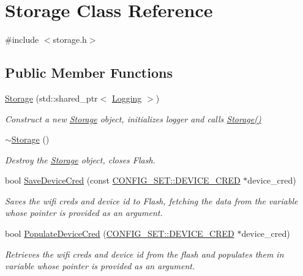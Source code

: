 \hypertarget{classStorage}{}\section{Storage Class Reference}
\label{classStorage}


{\ttfamily \#include $<$storage.\+h$>$}

\subsection*{Public Member Functions}
\begin{DoxyCompactItemize}
\item 
\hyperlink{classStorage_a6b40766d93f003a117435135e6c790bb}{Storage} (std\+::shared\+\_\+ptr$<$ \hyperlink{classLogging}{Logging} $>$)
\begin{DoxyCompactList}\small\item\em Construct a new \hyperlink{classStorage}{Storage} object, initializes logger and calls \hyperlink{classStorage_a6b40766d93f003a117435135e6c790bb}{Storage()} \end{DoxyCompactList}\item 
\hyperlink{classStorage_a73cf30f0a34250396f9eabee7dc5c93d}{$\sim$\+Storage} ()
\begin{DoxyCompactList}\small\item\em Destroy the \hyperlink{classStorage}{Storage} object, closes Flash. \end{DoxyCompactList}\item 
bool \hyperlink{classStorage_a6a1b8fc3b64a382e6b81228a40057677}{Save\+Device\+Cred} (const \hyperlink{structCONFIG__SET_1_1DEVICE__CRED}{C\+O\+N\+F\+I\+G\+\_\+\+S\+E\+T\+::\+D\+E\+V\+I\+C\+E\+\_\+\+C\+R\+ED} $\ast$device\+\_\+cred)
\begin{DoxyCompactList}\small\item\em Saves the wifi creds and device id to Flash, fetching the data from the variable whose pointer is provided as an argument. \end{DoxyCompactList}\item 
bool \hyperlink{classStorage_a6cd2e67130f5b1b753eea6e977ec4256}{Populate\+Device\+Cred} (\hyperlink{structCONFIG__SET_1_1DEVICE__CRED}{C\+O\+N\+F\+I\+G\+\_\+\+S\+E\+T\+::\+D\+E\+V\+I\+C\+E\+\_\+\+C\+R\+ED} $\ast$device\+\_\+cred)
\begin{DoxyCompactList}\small\item\em Retrieves the wifi creds and device id from the flash and populates them in variable whose pointer is provided as an argument. \end{DoxyCompactList}\item 

\end{DoxyCompactItemize}
